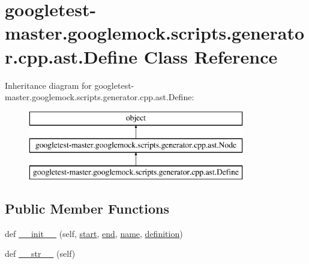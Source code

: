 \hypertarget{classgoogletest-master_1_1googlemock_1_1scripts_1_1generator_1_1cpp_1_1ast_1_1_define}{}\section{googletest-\/master.googlemock.\+scripts.\+generator.\+cpp.\+ast.\+Define Class Reference}
\label{classgoogletest-master_1_1googlemock_1_1scripts_1_1generator_1_1cpp_1_1ast_1_1_define}
Inheritance diagram for googletest-\/master.googlemock.\+scripts.\+generator.\+cpp.\+ast.\+Define\+:\begin{figure}[H]
\begin{center}
\leavevmode
\includegraphics[height=3.000000cm]{dc/d8a/classgoogletest-master_1_1googlemock_1_1scripts_1_1generator_1_1cpp_1_1ast_1_1_define}
\end{center}
\end{figure}
\subsection*{Public Member Functions}
\begin{DoxyCompactItemize}
\item 
def \mbox{\hyperlink{classgoogletest-master_1_1googlemock_1_1scripts_1_1generator_1_1cpp_1_1ast_1_1_define_a0acf57382103176350d2fff330b5823c}{\+\_\+\+\_\+init\+\_\+\+\_\+}} (self, \mbox{\hyperlink{classgoogletest-master_1_1googlemock_1_1scripts_1_1generator_1_1cpp_1_1ast_1_1_node_a6f9eb279a989f9ca27e7d0f1975336d1}{start}}, \mbox{\hyperlink{classgoogletest-master_1_1googlemock_1_1scripts_1_1generator_1_1cpp_1_1ast_1_1_node_a747e90ade89c1764e83b5b649bde18cc}{end}}, \mbox{\hyperlink{classgoogletest-master_1_1googlemock_1_1scripts_1_1generator_1_1cpp_1_1ast_1_1_define_a3ca9bb2d2c18a51f45b8d48221f09625}{name}}, \mbox{\hyperlink{classgoogletest-master_1_1googlemock_1_1scripts_1_1generator_1_1cpp_1_1ast_1_1_define_a1f17682a1ffde329aad92f58c614c1c1}{definition}})
\item 
def \mbox{\hyperlink{classgoogletest-master_1_1googlemock_1_1scripts_1_1generator_1_1cpp_1_1ast_1_1_define_a0955e932a8b23dfb982186476a25dbe2}{\+\_\+\+\_\+str\+\_\+\+\_\+}} (self)
\end{DoxyCompactItemize}

